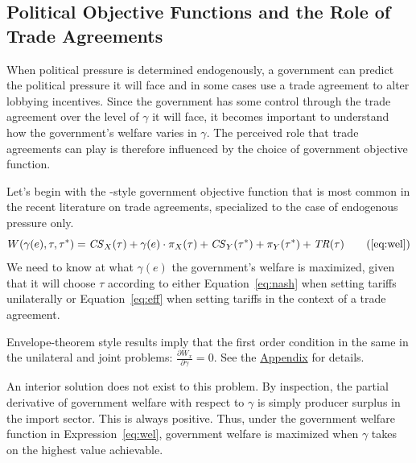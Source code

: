 \documentclass[12pt]{article}
\newtheorem{assumption}{Assumption}
\newcommand{\ga}{\gamma}
\begin{document}



\subsection{Political Objective Functions and the Role of Trade Agreements}
\label{sec:objfcn}
When political pressure is determined endogenously, a government can predict the political pressure it will face and in some cases use a trade agreement to alter lobbying incentives. Since the government has some control through the trade agreement over the level of $\ga$ it will face, it becomes important to understand how the government's welfare varies in $\ga$. The perceived role that trade agreements can play is therefore influenced by the choice of government objective function.

Let's begin with the \Textcite{baldwin}-style government objective function that is most common in the recent literature on trade agreements, specialized to the case of endogenous pressure only.
\begin{equation}
  W(\ga(e),\tau,\tau^*) = \mathit{CS}_X(\tau) + \ga(e) \cdot \pi_X(\tau) + \mathit{CS}_Y(\tau^*) + \pi_Y(\tau^*) + \mathit{TR}(\tau)
  \tag{\ref{eq:wel}}
\end{equation}
We need to know at what $\ga(e)$ the government's welfare is maximized, given that it will choose $\tau$ according to either Equation~\ref{eq:nash} when setting tariffs unilaterally or Equation~\ref{eq:eff} when setting tariffs in the context of a trade agreement.

Envelope-theorem style results imply that the first order condition in the same in the unilateral and joint problems: $\displaystyle \frac{\partial W_x}{\partial \ga} = 0$. See the \hyperlink{envelope}{Appendix} for details.

An interior solution does not exist to this problem. By inspection, the partial derivative of government welfare with respect to $\ga$ is simply producer surplus in the import sector. This is always positive. Thus, under the government welfare function in Expression~\ref{eq:wel}, government welfare is maximized when $\ga$ takes on the highest value achievable.
\end{document}
